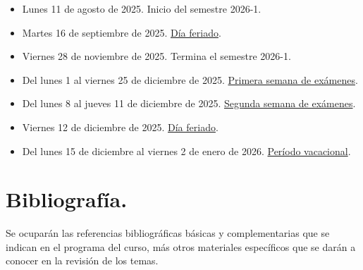 \documentclass[12pt]{article}
\numberwithin{equation}{section}
\begin{document}
\begin{itemize}
\item Lunes 11 de agosto de 2025. Inicio del semestre 2026-1.
\item Martes 16 de septiembre de 2025. \underline{Día feriado}.
\item Viernes 28 de noviembre de 2025. Termina el semestre 2026-1.
\item Del lunes 1 al viernes 25 de diciembre de 2025. \underline{Primera semana de exámenes}.
\item Del lunes 8 al jueves 11 de diciembre de 2025. \underline{Segunda semana de exámenes}.
\item Viernes 12 de diciembre de 2025. \underline{Día feriado}.
\item Del lunes 15 de diciembre al viernes 2 de enero de 2026. \underline{Período vacacional}.
\end{itemize}

\newpage

\section{Bibliografía.}

Se ocuparán las referencias bibliográficas básicas y complementarias que se indican en el programa del curso, más otros materiales específicos que se darán a conocer en la revisión de los temas.

\nocite{*}
\printbibliography[title=Referencias para el curso.]
\end{document}
